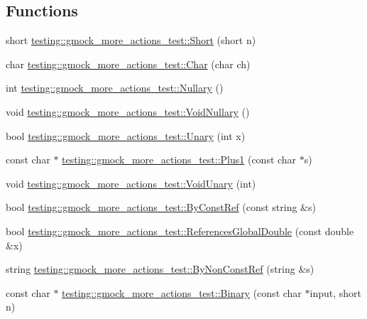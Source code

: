 \subsection*{Functions}
\begin{DoxyCompactItemize}
\item 
short \hyperlink{namespacetesting_1_1gmock__more__actions__test_a00503d3168f1123e314c0d42b7e10b88}{testing\+::gmock\+\_\+more\+\_\+actions\+\_\+test\+::\+Short} (short n)
\item 
char \hyperlink{namespacetesting_1_1gmock__more__actions__test_af69e6906d734a99d60480e4291891d66}{testing\+::gmock\+\_\+more\+\_\+actions\+\_\+test\+::\+Char} (char ch)
\item 
int \hyperlink{namespacetesting_1_1gmock__more__actions__test_acdd2dd80f777fdb770b513b63064ac19}{testing\+::gmock\+\_\+more\+\_\+actions\+\_\+test\+::\+Nullary} ()
\item 
void \hyperlink{namespacetesting_1_1gmock__more__actions__test_a061f6d66383a4e793b4d4ca93bd8ca2f}{testing\+::gmock\+\_\+more\+\_\+actions\+\_\+test\+::\+Void\+Nullary} ()
\item 
bool \hyperlink{namespacetesting_1_1gmock__more__actions__test_aad456ea2ee1b0cb2741b676a34f540a3}{testing\+::gmock\+\_\+more\+\_\+actions\+\_\+test\+::\+Unary} (int x)
\item 
const char $\ast$ \hyperlink{namespacetesting_1_1gmock__more__actions__test_a986ada18d3311d3fa3a7c33e54e18f33}{testing\+::gmock\+\_\+more\+\_\+actions\+\_\+test\+::\+Plus1} (const char $\ast$s)
\item 
void \hyperlink{namespacetesting_1_1gmock__more__actions__test_a163632ef644604032f00334fce36de1a}{testing\+::gmock\+\_\+more\+\_\+actions\+\_\+test\+::\+Void\+Unary} (int)
\item 
bool \hyperlink{namespacetesting_1_1gmock__more__actions__test_ab175725bcdacf7a00948c7d5c1a36419}{testing\+::gmock\+\_\+more\+\_\+actions\+\_\+test\+::\+By\+Const\+Ref} (const string \&s)
\item 
bool \hyperlink{namespacetesting_1_1gmock__more__actions__test_ae2d3dddc96f5657127593f129cd3fc51}{testing\+::gmock\+\_\+more\+\_\+actions\+\_\+test\+::\+References\+Global\+Double} (const double \&x)
\item 
string \hyperlink{namespacetesting_1_1gmock__more__actions__test_ac0099e2d9f40351252df31feda822b71}{testing\+::gmock\+\_\+more\+\_\+actions\+\_\+test\+::\+By\+Non\+Const\+Ref} (string \&s)
\item 
const char $\ast$ \hyperlink{namespacetesting_1_1gmock__more__actions__test_a853c9f048674a60798b930750b74a1df}{testing\+::gmock\+\_\+more\+\_\+actions\+\_\+test\+::\+Binary} (const char $\ast$input, short n)

\end{DoxyCompactItemize}
